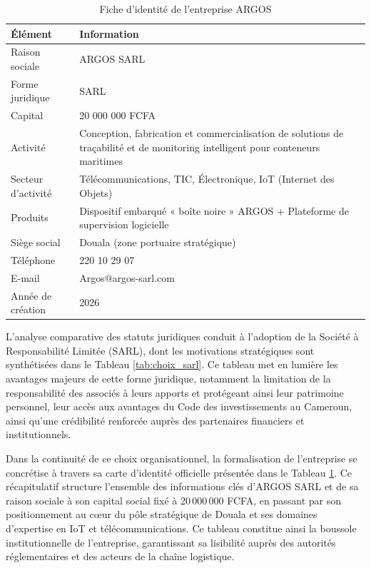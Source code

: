\begin{table}[htbp]
    \centering
    \caption{Fiche d'identité de l'entreprise ARGOS}
    \label{tab:fiche_identite}
    \renewcommand{\arraystretch}{1.5}
    \begin{tabularx}{\textwidth}{|>{\raggedright\arraybackslash}p{4cm}|X|}
        \hline
        \textbf{Élément} & \textbf{Information} \\
        \hline
        Raison sociale & ARGOS SARL \\
        \hline
        Forme juridique & SARL \\
        \hline
        Capital & 20 000 000 FCFA \\
        \hline
        Activité & Conception, fabrication et commercialisation de solutions de traçabilité et de monitoring intelligent pour conteneurs maritimes \\
        \hline
        Secteur d'activité & Télécommunications, TIC, Électronique, IoT (Internet des Objets) \\
        \hline
        Produits & Dispositif embarqué « boîte noire » ARGOS + Plateforme de supervision logicielle \\
        \hline
        Siège social & Douala (zone portuaire stratégique) \\
        \hline
        Téléphone & 220 10 29 07 \\
        \hline
        E-mail & Argos@argos-sarl.com \\
        \hline
        Année de création & 2026 \\
        \hline
    \end{tabularx}
    \tablesourcepromoteurs
\end{table}

L’analyse comparative des statuts juridiques conduit à l'adoption de la Société à Responsabilité Limitée (SARL), dont les motivations stratégiques sont synthétisées dans le Tableau \ref{tab:choix_sarl}. Ce tableau met en lumière les avantages majeurs de cette forme juridique, notamment la limitation de la responsabilité des associés à leurs apports et protégeant ainsi leur patrimoine personnel, leur accès aux avantages du Code des investissements au Cameroun, ainsi qu'une crédibilité renforcée auprès des partenaires financiers et institutionnels.

Dans la continuité de ce choix organisationnel, la formalisation de l'entreprise se concrétise à travers sa carte d'identité officielle présentée dans le Tableau \ref{tab:fiche_identite}. Ce récapitulatif structure l'ensemble des informations clés d'ARGOS SARL et de sa raison sociale à son capital social fixé à 20\,000\,000 FCFA, en passant par son positionnement au cœur du pôle stratégique de Douala et ses domaines d'expertise en IoT et télécommunications. Ce tableau constitue ainsi la boussole institutionnelle de l'entreprise, garantissant sa lisibilité auprès des autorités réglementaires et des acteurs de la chaîne logistique.

